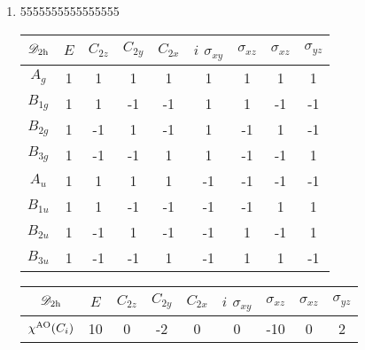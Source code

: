 \documentclass[a4paper]{book}
\newcommand{\AO}{{\rm AO}}
\begin{document}
\begin{solution}
\begin{enumerate}[label=(\alph*)]
		
		\item 5555555555555555
		
		\begin{center}
		\begin{tabular}{ccccccccc}\hline
	$\mathscr{D}_{\rm 2h}$ & $E$ & $C_{2z}$ &	$C_{2y}$	& $C_{2x}$	&	$i$	$\sigma_{xy}$	&	$\sigma_{xz}$	&	$\sigma_{xz}$ &	$\sigma_{yz}$\\ \hline
			$A_g$		&	1	&	1	&	1	&	1	&	1	&	1	&	1	&	1	\\
			$B_{1g}$	&	1	&	1	&	-1	&	-1	&	1	&	1	&	-1	&	-1	\\
			$B_{2g}$ 	&	1	&	-1	&	1	&	-1	&	1	&	-1	&	1	&	-1	\\
			$B_{3g}$ 	&	1	&	-1	&	-1	&	1	&	1	&	-1	&	-1	&	1	\\ 
			$A_u$		&	1	&	1	&	1	&	1	&	-1	&	-1	&	-1	&	-1	\\
			$B_{1u}$	&	1	&	1	&	-1	&	-1	&	-1	&	-1	&	1	&	1	\\
			$B_{2u}$ 	&	1	&	-1	&	1	&	-1	&	-1	&	1	&	-1	&	1	\\
			$B_{3u}$ 	&	1	&	-1	&	-1	&	1	&	-1	&	1	&	1	&	-1	\\ \hline
		\end{tabular}
		\end{center}
		
		
		\begin{center}
		\begin{tabular}{ccccccccc}\hline
	$\mathscr{D}_{\rm 2h}$	& $E$ & $C_{2z}$ &	$C_{2y}$	& $C_{2x}$	&	$i$	$\sigma_{xy}$	&	$\sigma_{xz}$	&	$\sigma_{xz}$ &	$\sigma_{yz}$  \\ \hline
	$\chi^{\AO}(C_i)$	&	10	&	0	&	-2	&	0	&	0	&	-10	&	0	&	2	\\ \hline
		\end{tabular}
		\end{center}
		

\end{enumerate}
\end{solution}
\end{document}
